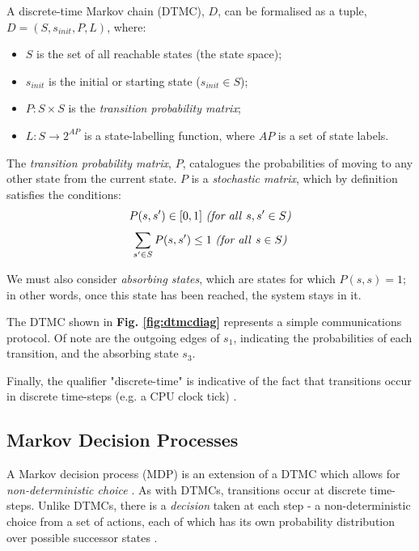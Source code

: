 \documentclass{l4proj}
\begin{document}
A discrete-time Markov chain (DTMC), $D$, can be formalised as a tuple, $D = (S, s_{init}, P, L)$, where:

\begin{itemize}
    \item $S$ is the set of all reachable states (the state space);
    \item $s_{init}$ is the initial or starting state ($s_{init} \in S$);
    \item $P: S \times S$ is the \textit{transition probability matrix};
    \item $L : S \to 2^{AP}$ is a state-labelling function, where $AP$ is a set of state labels.
\end{itemize}

The \textit{transition probability matrix}, $P$, catalogues the probabilities of moving to any other state from the current state. $P$ is a \textit{stochastic matrix}, which by definition satisfies the conditions: \[P(s, s') \in [0,1] \textnormal{ \textit{(for all }} s, s' \in S \textnormal{\textit{)}}\] \[\sum_{s' \in S} P(s, s') \leq 1 \textnormal{ \textit{(for all }} s \in S \textnormal{\textit{)}}\]

We must also consider \textit{absorbing states}, which are states for which $P(s,s) = 1$; in other words, once this state has been reached, the system stays in it.

The DTMC shown in \textbf{Fig. \ref{fig:dtmcdiag}} represents a simple communications protocol. Of note are the outgoing edges of $s_{1}$, indicating the probabilities of each transition, and the absorbing state $s_{3}$.

Finally, the qualifier "discrete-time" is indicative of the fact that transitions occur in discrete time-steps (e.g. a CPU clock tick) \cite{dpox1}.

\subsection{Markov Decision Processes}

A Markov decision process (MDP) is an extension of a DTMC which allows for \textit{non-deterministic choice} \cite{pomc1}. As with DTMCs, transitions occur at discrete time-steps. Unlike DTMCs, there is a \textit{decision} taken at each step - a non-deterministic choice from a set of actions, each of which has its own probability distribution over possible successor states \cite{dpox1}.
\end{document}
